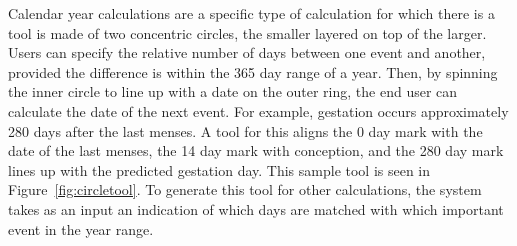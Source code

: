 \documentclass{sig-alternate}
\begin{document}

Calendar year calculations are a specific type of calculation for which there is a tool is made of two concentric circles, the smaller layered on top of the larger. Users can specify the relative number of days between one event and another, provided the difference is within the 365 day range of a year. Then, by spinning the inner circle to line up with a date on the outer ring, the end user can calculate the date of the next event. For example, gestation occurs approximately 280 days after the last menses. A tool for this aligns the 0 day mark with the date of the last menses, the 14 day mark with conception, and the 280 day mark lines up with the predicted gestation day. This sample tool is seen in Figure~\ref{fig:circletool}. To generate this tool for other calculations, the \nifty system takes as an input an indication of which days are matched with which important event in the year range.


\end{document}
